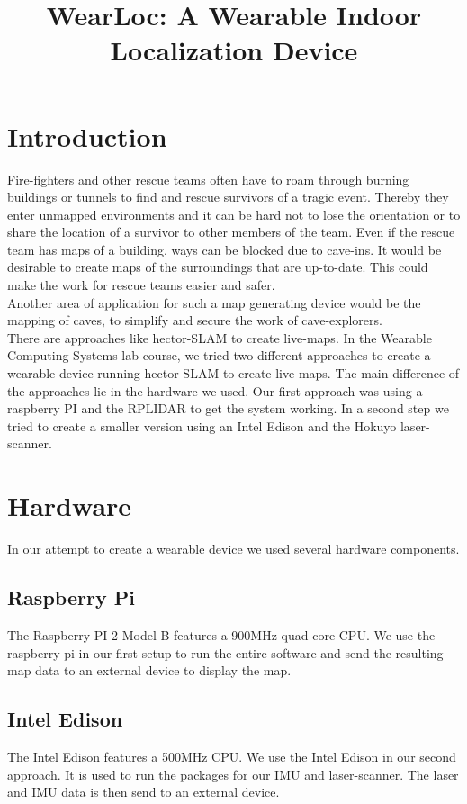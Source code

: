 \documentclass{sigchi-ext}
\title{WearLoc: A Wearable Indoor Localization Device}
\author{%
  \alignauthor{%
    \textbf{Lukas Gemein}\\
    \email{gemeinl@cs.uni-freiburg.de} }\alignauthor{%
    \textbf{Jennifer Nist}\\
    \email{nistj@cs.uni-freiburg.de} } \vfil \alignauthor{%
    \textbf{Rick Gelhausen}\\
    \email{rick.gelhausen@gmail.com} }\alignauthor{%
    \textbf{David Speck}\\
    \email{speckd@cs.uni-freiburg.de} } \vfil \alignauthor{%
    \textbf{Andre Biedenkapp}\\   
    \email{biedenka@cs.uni-freiburg.de}}}
\begin{document}
\maketitle

\RaggedRight{} 

\section{Introduction}
Fire-fighters and other rescue teams often have to roam through burning buildings or tunnels to find and rescue survivors of a tragic event. Thereby they enter unmapped environments and it can be hard not to lose the orientation or to share the location of a survivor to other members of the team. Even if the rescue team has maps of a building, ways can be blocked due to cave-ins. It would be desirable to create maps of the surroundings that are up-to-date. This could make the work for rescue teams easier and safer.\\
Another area of application for such a map generating device would be the mapping of caves, to simplify and secure the work of cave-explorers.\\
There are approaches like hector-SLAM to create live-maps. In the Wearable Computing Systems lab course, we tried two different approaches to create a wearable device running hector-SLAM to create live-maps. The main difference of the approaches lie in the hardware we used. Our first approach was using a raspberry PI and the RPLIDAR to get the system working. In a second step we tried to create a smaller version using an Intel Edison and the Hokuyo laser-scanner.\\
\newpage
\section{Hardware}
In our attempt to create a wearable device we used several hardware components.
\subsection{Raspberry Pi}
The Raspberry PI 2 Model B features a 900MHz quad-core CPU. We use the raspberry pi in our first setup to run the entire software and send the resulting map data to an external device to display the map.
\subsection{Intel Edison}
The Intel Edison features a 500MHz CPU. We use the Intel Edison in our second approach. It is used to run the packages for our IMU and laser-scanner. The laser and IMU data is then send to an external device.
\end{document}
